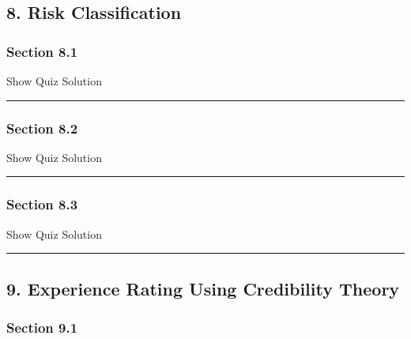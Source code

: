 \documentclass[]{article}
\begin{document}
\subsection{8. Risk Classification}\label{risk-classification}

\subsubsection{Section 8.1}\label{section-8.1}

\hypertarget{surveyElement81}{}

\hypertarget{surveyResult81}{}

Show Quiz Solution

\hypertarget{display.Quiz81.2}{}
\begin{center}\rule{0.5\linewidth}{\linethickness}\end{center}

\subsubsection{Section 8.2}\label{section-8.2}

\hypertarget{surveyElement82}{}

\hypertarget{surveyResult82}{}

Show Quiz Solution

\hypertarget{display.Quiz82.2}{}
\begin{center}\rule{0.5\linewidth}{\linethickness}\end{center}

\subsubsection{Section 8.3}\label{section-8.3}

\hypertarget{surveyElement83}{}

\hypertarget{surveyResult83}{}

Show Quiz Solution

\hypertarget{display.Quiz83.2}{}
\begin{center}\rule{0.5\linewidth}{\linethickness}\end{center}

\subsection{9. Experience Rating Using Credibility
Theory}\label{experience-rating-using-credibility-theory}

\subsubsection{Section 9.1}\label{section-9.1}
\end{document}
